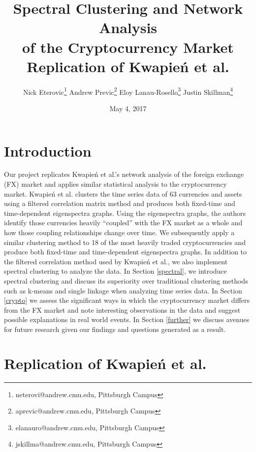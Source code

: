 \documentclass[a4paper]{article}
\title{\vspace{-3.5cm} %
  Spectral Clustering and Network Analysis \\
  of the Cryptocurrency Market \\ \vspace{.2cm}
  \large Replication of  Kwapień et al.\cite{kawpien}}
\date{May 4, 2017}
\author{Nick Eterovic\thanks{neterovi@andrew.cmu.edu, Pittsburgh Campus} \quad \quad Andrew Previc\thanks{aprevic@andrew.cmu.edu, Pittsburgh Campus} \quad  \quad 
		Eloy Lanau-Rosello\thanks{elanauro@andrew.cmu.edu, Pittsburgh Campus} \quad \quad Justin Skillman\thanks{jskillma@andrew.cmu.edu, Pittsburgh Campus}}
\begin{document}
 
\maketitle
\tableofcontents
\newpage
\begin{multicols}{2}

\section{Introduction}\label{intro} %
Our project replicates Kwapień et al.'s\cite{kawpien} network analysis of the foreign exchange (FX) market and applies similar statistical analysis to the cryptocurrency market. Kwapień et al. clusters the time series data of 63 currencies and assets using a filtered correlation matrix method and produces both fixed-time and time-dependent eigenspectra graphs. Using the eigenspectra graphs, the authors identify those currencies heavily ``coupled'' with the FX market as a whole and how those coupling relationships change over time. We subsequently apply a similar clustering method to 18 of the most heavily traded cryptocurrencies and produce both fixed-time and time-dependent eigenspectra graphs. In addition to the filtered correlation method used by Kwapień et al., we also implement spectral clustering to analyze the data. In Section \ref{spectral}, we introduce spectral clustering and discuss its superiority over traditional clustering methods such as k-means and single linkage when analyzing time series data. In Section \ref{crypto} we assess the significant ways in which the cryptocurrency market differs from the FX market and note interesting observations in the data and suggest possible explanations in real world events. In Section \ref{further} we discuss avenues for future research given our findings and questions generated as a result.

\section{Replication of Kwapień et al.}\label{kwapien}


\end{multicols}
\end{document}
